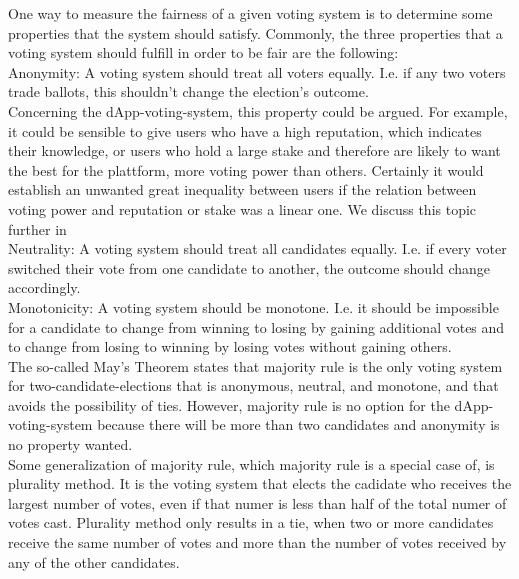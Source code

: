 
One way to measure the fairness of a given voting system is to determine some properties that the system should satisfy. 
Commonly, the three properties that a voting system should fulfill in order to be fair are the following: \\
Anonymity: A voting system should treat all voters equally. I.e. if any two voters trade ballots, this shouldn't change the election's outcome. \\
Concerning the dApp-voting-system, this property could be argued. For example, it could be sensible to give users who have a high reputation, which indicates their knowledge, or users who hold a large stake and therefore are likely to want the best for the plattform, more voting power than others. Certainly it would establish an unwanted great inequality between users if the relation between voting power and reputation or stake was a linear one. We discuss this topic further in \\%
Neutrality: A voting system should treat all candidates equally. I.e. if every voter switched their vote from one candidate to another, the outcome should change accordingly. \\
Monotonicity: A voting system should be monotone. I.e. it should be impossible for a candidate to change from winning to losing by gaining additional votes and to change from losing to winning by losing votes without gaining others. \\
The so-called May's Theorem states that majority rule %
is the only voting system for two-candidate-elections that is anonymous, neutral, and monotone, and that avoids the possibility of ties. However, majority rule is no option for the dApp-voting-system because there will be more than two candidates and anonymity is no property wanted. \\
Some generalization of majority rule, which majority rule is a special case of, is plurality method. It is the voting system that elects the cadidate who receives the largest number of votes, even if that numer is less than half of the total numer of votes cast. Plurality method only results in a tie, when two or more candidates receive the same number of votes and more than the number of votes received by any of the other candidates. \\
